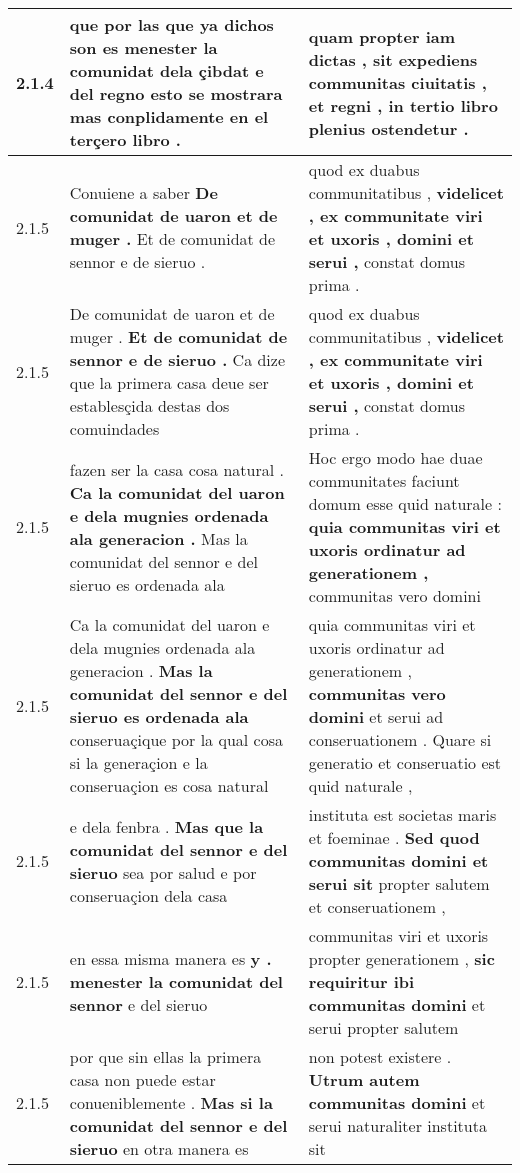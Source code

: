 \begin{tabular}{|p{1cm}|p{6.5cm}|p{6.5cm}|}
2.1.4 & que por las que ya dichos son \textbf{ es menester la comunidat dela çibdat } e del regno esto se mostrara mas conplidamente en el terçero libro . & quam propter iam dictas , \textbf{ sit expediens communitas ciuitatis , et regni , } in tertio libro plenius ostendetur . \\\hline
2.1.5 & Conuiene a saber \textbf{ De comunidat de uaron et de muger . } Et de comunidat de sennor e de sieruo . & quod ex duabus communitatibus , \textbf{ videlicet , ex communitate viri et uxoris , domini et serui , } constat domus prima . \\\hline
2.1.5 & De comunidat de uaron et de muger . \textbf{ Et de comunidat de sennor e de sieruo . } Ca dize que la primera casa deue ser establesçida destas dos comuindades & quod ex duabus communitatibus , \textbf{ videlicet , ex communitate viri et uxoris , domini et serui , } constat domus prima . \\\hline
2.1.5 & fazen ser la casa cosa natural . \textbf{ Ca la comunidat del uaron e dela mugnies ordenada ala generacion . } Mas la comunidat del sennor e del sieruo es ordenada ala & Hoc ergo modo hae duae communitates faciunt domum esse quid naturale : \textbf{ quia communitas viri et uxoris ordinatur ad generationem , } communitas vero domini \\\hline
2.1.5 & Ca la comunidat del uaron e dela mugnies ordenada ala generacion . \textbf{ Mas la comunidat del sennor e del sieruo es ordenada ala } conseruaçique por la qual cosa si la generaçion e la conseruaçion es cosa natural & quia communitas viri et uxoris ordinatur ad generationem , \textbf{ communitas vero domini } et serui ad conseruationem . Quare si generatio et conseruatio est quid naturale , \\\hline
2.1.5 & e dela fenbra . \textbf{ Mas que la comunidat del sennor e del sieruo } sea por salud e por conseruaçion dela casa & instituta est societas maris et foeminae . \textbf{ Sed quod communitas domini et serui sit } propter salutem et conseruationem , \\\hline
2.1.5 & en essa misma manera es \textbf{ y . menester la comunidat del sennor } e del sieruo & communitas viri et uxoris propter generationem , \textbf{ sic requiritur ibi communitas domini } et serui propter salutem \\\hline
2.1.5 & por que sin ellas la primera casa non puede estar conueniblemente . \textbf{ Mas si la comunidat del sennor e del sieruo } en otra manera es & non potest existere . \textbf{ Utrum autem communitas domini } et serui naturaliter instituta sit \\\hline

\end{tabular}
